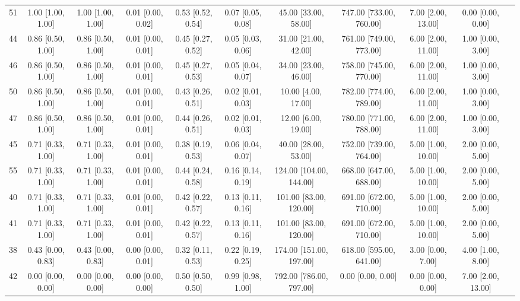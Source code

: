 \documentclass[8pt]{article}
\begin{document}
\begin{center}
\begin{footnotesize}
\begin{longtable}{|ccccccccccc|}
 51 &  1.00 [1.00, 1.00] &  1.00 [1.00, 1.00] &  0.01 [0.00, 0.02] &  0.53 [0.52, 0.54] &  0.07 [0.05, 0.08] &     45.00 [33.00, 58.00] &  747.00 [733.00, 760.00] &  7.00 [2.00, 13.00] &   0.00 [0.00, 0.00] \\
 44 &  0.86 [0.50, 1.00] &  0.86 [0.50, 1.00] &  0.01 [0.00, 0.01] &  0.45 [0.27, 0.52] &  0.05 [0.03, 0.06] &     31.00 [21.00, 42.00] &  761.00 [749.00, 773.00] &  6.00 [2.00, 11.00] &   1.00 [0.00, 3.00] \\
 46 &  0.86 [0.50, 1.00] &  0.86 [0.50, 1.00] &  0.01 [0.00, 0.01] &  0.45 [0.27, 0.53] &  0.05 [0.04, 0.07] &     34.00 [23.00, 46.00] &  758.00 [745.00, 770.00] &  6.00 [2.00, 11.00] &   1.00 [0.00, 3.00] \\
 50 &  0.86 [0.50, 1.00] &  0.86 [0.50, 1.00] &  0.01 [0.00, 0.01] &  0.43 [0.26, 0.51] &  0.02 [0.01, 0.03] &      10.00 [4.00, 17.00] &  782.00 [774.00, 789.00] &  6.00 [2.00, 11.00] &   1.00 [0.00, 3.00] \\
 47 &  0.86 [0.50, 1.00] &  0.86 [0.50, 1.00] &  0.01 [0.00, 0.01] &  0.44 [0.26, 0.51] &  0.02 [0.01, 0.03] &      12.00 [6.00, 19.00] &  780.00 [771.00, 788.00] &  6.00 [2.00, 11.00] &   1.00 [0.00, 3.00] \\
 45 &  0.71 [0.33, 1.00] &  0.71 [0.33, 1.00] &  0.01 [0.00, 0.01] &  0.38 [0.19, 0.53] &  0.06 [0.04, 0.07] &     40.00 [28.00, 53.00] &  752.00 [739.00, 764.00] &  5.00 [1.00, 10.00] &   2.00 [0.00, 5.00] \\
 55 &  0.71 [0.33, 1.00] &  0.71 [0.33, 1.00] &  0.01 [0.00, 0.01] &  0.44 [0.24, 0.58] &  0.16 [0.14, 0.19] &  124.00 [104.00, 144.00] &  668.00 [647.00, 688.00] &  5.00 [1.00, 10.00] &   2.00 [0.00, 5.00] \\
 40 &  0.71 [0.33, 1.00] &  0.71 [0.33, 1.00] &  0.01 [0.00, 0.01] &  0.42 [0.22, 0.57] &  0.13 [0.11, 0.16] &   101.00 [83.00, 120.00] &  691.00 [672.00, 710.00] &  5.00 [1.00, 10.00] &   2.00 [0.00, 5.00] \\
 41 &  0.71 [0.33, 1.00] &  0.71 [0.33, 1.00] &  0.01 [0.00, 0.01] &  0.42 [0.22, 0.57] &  0.13 [0.11, 0.16] &   101.00 [83.00, 120.00] &  691.00 [672.00, 710.00] &  5.00 [1.00, 10.00] &   2.00 [0.00, 5.00] \\
 38 &  0.43 [0.00, 0.83] &  0.43 [0.00, 0.83] &  0.00 [0.00, 0.01] &  0.32 [0.11, 0.53] &  0.22 [0.19, 0.25] &  174.00 [151.00, 197.00] &  618.00 [595.00, 641.00] &   3.00 [0.00, 7.00] &   4.00 [1.00, 8.00] \\
 42 &  0.00 [0.00, 0.00] &  0.00 [0.00, 0.00] &  0.00 [0.00, 0.00] &  0.50 [0.50, 0.50] &  0.99 [0.98, 1.00] &  792.00 [786.00, 797.00] &        0.00 [0.00, 0.00] &   0.00 [0.00, 0.00] &  7.00 [2.00, 13.00] \\

\end{longtable}
\end{footnotesize}
\end{center}
\end{document}
